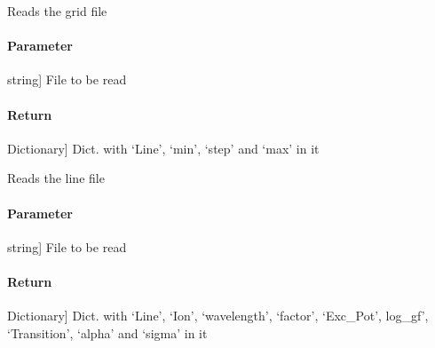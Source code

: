 \documentclass[letterpaper,10pt,english]{sphinxmanual}
\begin{document}
\begin{fulllineitems}
\label{\detokenize{functions:sir.read_grid}}
\pysigstartsignatures
{}
\pysigstopsignatures
\sphinxAtStartPar
Reads the grid file


\paragraph{Parameter}
\label{\detokenize{functions:id7}}\begin{description}
\sphinxlineitem{filename}{[}string{]}
\sphinxAtStartPar
File to be read

\end{description}


\paragraph{Return}
\label{\detokenize{functions:id8}}\begin{description}
\sphinxlineitem{dict}{[}Dictionary{]}
\sphinxAtStartPar
Dict. with ‘Line’, ‘min’, ‘step’ and ‘max’ in it

\end{description}

\end{fulllineitems}


\begin{fulllineitems}
\label{\detokenize{functions:sir.read_line}}
\pysigstartsignatures
{}
\pysigstopsignatures
\sphinxAtStartPar
Reads the line file


\paragraph{Parameter}
\label{\detokenize{functions:id9}}\begin{description}
\sphinxlineitem{filename}{[}string{]}
\sphinxAtStartPar
File to be read

\end{description}


\paragraph{Return}
\label{\detokenize{functions:id10}}\begin{description}
\sphinxlineitem{dict}{[}Dictionary{]}
\sphinxAtStartPar
Dict. with ‘Line’, ‘Ion’, ‘wavelength’, ‘factor’, ‘Exc\_Pot’, log\_gf’,
‘Transition’, ‘alpha’ and ‘sigma’ in it

\end{description}

\end{fulllineitems}
\end{document}
